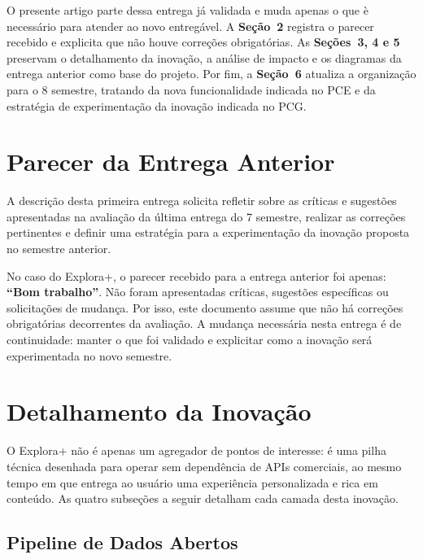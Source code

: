 \documentclass[12pt, a4paper]{article}
\begin{document}
O presente artigo parte dessa entrega j\'a validada e muda apenas o que \`e necess\'ario para atender ao novo entreg\'avel. A \textbf{Se\c{c}\~ao~2} registra o parecer recebido e explicita que n\~ao houve corre\c{c}\~oes obrigat\'orias. As \textbf{Se\c{c}\~oes~3, 4 e 5} preservam o detalhamento da inova\c{c}\~ao, a an\'alise de impacto e os diagramas da entrega anterior como base do projeto. Por fim, a \textbf{Se\c{c}\~ao~6} atualiza a organiza\c{c}\~ao para o 8\textordmasculine{} semestre, tratando da nova funcionalidade indicada no PCE e da estrat\'egia de experimenta\c{c}\~ao da inova\c{c}\~ao indicada no PCG.
\clearpage
\section{Parecer da Entrega Anterior}

A descri\c{c}\~ao desta primeira entrega solicita refletir sobre as cr\'iticas e sugest\~oes apresentadas na avalia\c{c}\~ao da \'ultima entrega do 7\textordmasculine{} semestre, realizar as corre\c{c}\~oes pertinentes e definir uma estrat\'egia para a experimenta\c{c}\~ao da inova\c{c}\~ao proposta no semestre anterior.

No caso do Explora+, o parecer recebido para a entrega anterior foi apenas: \textbf{``Bom trabalho''}. N\~ao foram apresentadas cr\'iticas, sugest\~oes espec\'ificas ou solicita\c{c}\~oes de mudan\c{c}a. Por isso, este documento assume que n\~ao h\'a corre\c{c}\~oes obrigat\'orias decorrentes da avalia\c{c}\~ao. A mudan\c{c}a necess\'aria nesta entrega \'e de continuidade: manter o que foi validado e explicitar como a inova\c{c}\~ao ser\'a experimentada no novo semestre.
\clearpage
\section{Detalhamento da Inova\c{c}\~ao}

O Explora+ n\~ao \'e apenas um agregador de pontos de interesse: \'e uma pilha t\'ecnica desenhada para operar sem depend\^encia de APIs comerciais, ao mesmo tempo em que entrega ao usu\'ario uma experi\^encia personalizada e rica em conte\'udo. As quatro subse\c{c}\~oes a seguir detalham cada camada desta inova\c{c}\~ao.

\subsection{Pipeline de Dados Abertos}
\end{document}
